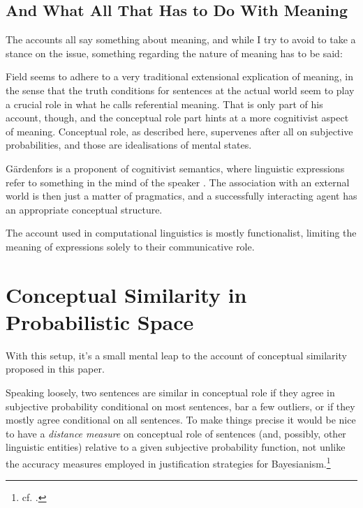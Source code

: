 \documentclass[11pt, a4paper]{scrartcl}
\renewcommand{\i}[1]{\emph{#1}}
\begin{document}
\subsection{And What All That Has to Do With Meaning}

The accounts all say something about meaning, and while I try to avoid to take a stance on the issue, something regarding the nature of meaning has to be said: 

Field seems to adhere to a very traditional extensional explication of meaning, in the sense that the truth conditions for sentences at the actual world seem to play a crucial role in what he calls referential meaning. That is only part of his account, though, and the conceptual role part hints at a more cognitivist aspect of meaning. Conceptual role, as described here, supervenes after all on subjective probabilities, and those are idealisations of mental states. 

Gärdenfors is a proponent of cognitivist semantics, where linguistic expressions refer to something in the mind of the speaker \parencite[154]{gärdenfors2004conceptual}. The association with an external world is then just a matter of pragmatics, and a successfully interacting agent has an appropriate conceptual structure. 

The account used in computational linguistics is mostly functionalist, limiting the meaning of expressions solely to their communicative role. 


\section{Conceptual Similarity in Probabilistic Space}

With this setup, it's a small mental leap to the account of conceptual similarity proposed in this paper. 

Speaking loosely, two sentences are similar in conceptual role if they agree in subjective probability conditional on most sentences, bar a few outliers, or if they mostly agree conditional on all sentences. To make things precise it would be nice to have a \i{distance measure} on conceptual role of sentences (and, possibly, other linguistic entities) relative to a given subjective probability function, not unlike the accuracy measures employed in justification strategies for Bayesianism.\footnote{cf. \textcite{Leitgeb2010}.}
\end{document}
